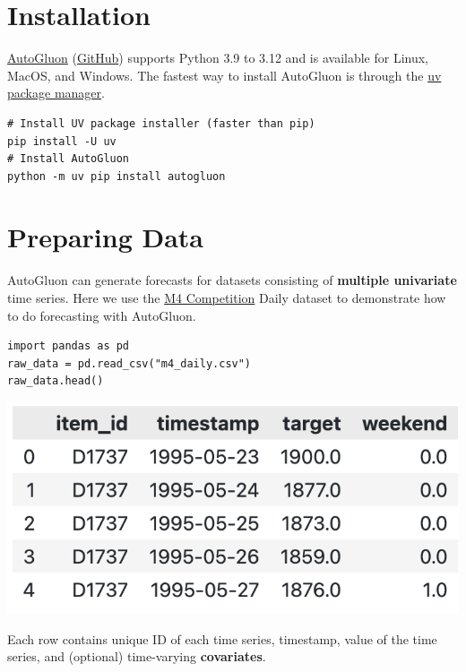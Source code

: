 \section*{Installation}
\href{https://auto.gluon.ai/stable/index.html}{AutoGluon} (\href{https://github.com/autogluon/autogluon/}{GitHub}) supports Python 3.9 to 3.12 and is available for Linux, MacOS, and Windows. The fastest way to install AutoGluon is through the \href{https://docs.astral.sh/uv/}{uv package manager}.

\begin{verbatim}
# Install UV package installer (faster than pip)
pip install -U uv
# Install AutoGluon
python -m uv pip install autogluon
\end{verbatim}


\section*{Preparing Data}

AutoGluon can generate forecasts for datasets consisting of \textbf{multiple univariate} time series. Here we use the \href{https://www.sciencedirect.com/science/article/pii/S0169207019301128}{M4 Competition} Daily dataset to demonstrate how to do forecasting with AutoGluon.

\begin{verbatim}
import pandas as pd
raw_data = pd.read_csv("m4_daily.csv")
raw_data.head()
\end{verbatim}

\begin{center}
\includegraphics[width=0.6\linewidth]{timeseries/images/raw_data.png}
\end{center}

\medskip

Each row contains unique ID of each time series, timestamp, value of the time series, and (optional) time-varying \textbf{covariates}.

